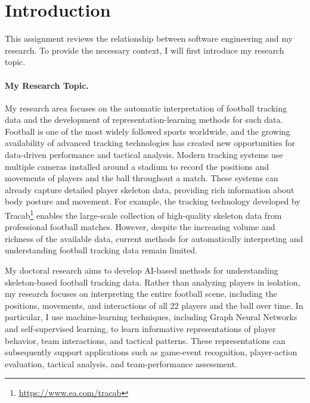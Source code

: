 \section{Introduction}

This assignment reviews the relationship between software engineering and my research. To provide the necessary context, I will first introduce my research topic.


\paragraph{My Research Topic.}

My research area focuses on the automatic interpretation of football tracking data and the development of representation-learning methods for such data. Football is one of the most widely followed sports worldwide, and the growing availability of advanced tracking technologies has created new opportunities for data-driven performance and tactical analysis. Modern tracking systems use multiple cameras installed around a stadium to record the positions and movements of players and the ball throughout a match. These systems can already capture detailed player skeleton data, providing rich information about body posture and movement. For example, the tracking technology developed by Tracab\footnote{\url{https://www.ea.com/tracab}} enables the large-scale collection of high-quality skeleton data from professional football matches. However, despite the increasing volume and richness of the available data, current methods for automatically interpreting and understanding football tracking data remain limited.


My doctoral research aims to develop AI-based methods for understanding skeleton-based football tracking data. Rather than analyzing players in isolation, my research focuses on interpreting the entire football scene, including the positions, movements, and interactions of all 22 players and the ball over time. In particular, I use machine-learning techniques, including Graph Neural Networks and self-supervised learning, to learn informative representations of player behavior, team interactions, and tactical patterns. These representations can subsequently support applications such as game-event recognition, player-action evaluation, tactical analysis, and team-performance assessment.

